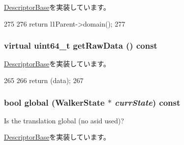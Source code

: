 \hyperlink{classArmISA_1_1TableWalker_1_1DescriptorBase_af3d561535442b70040e5fd7ff04eff12}{DescriptorBase}を実装しています。


\begin{DoxyCode}
275         {
276             return l1Parent->domain();
277         }
\end{DoxyCode}
\hypertarget{classArmISA_1_1TableWalker_1_1L2Descriptor_a22438a8aab2360360239d433b2f8fc50}{
\subsubsection[{getRawData}]{\setlength{\rightskip}{0pt plus 5cm}virtual uint64\_\-t getRawData () const}}
\label{classArmISA_1_1TableWalker_1_1L2Descriptor_a22438a8aab2360360239d433b2f8fc50}


\hyperlink{classArmISA_1_1TableWalker_1_1DescriptorBase_a2d8a1d7c99e0e52420d8be6cbd821697}{DescriptorBase}を実装しています。


\begin{DoxyCode}
265         {
266             return (data);
267         }
\end{DoxyCode}
\hypertarget{classArmISA_1_1TableWalker_1_1L2Descriptor_ad6798ebc36be05efa22b3fb9f3702d83}{
\subsubsection[{global}]{\setlength{\rightskip}{0pt plus 5cm}bool global ({\bf WalkerState} $\ast$ {\em currState}) const}}
\label{classArmISA_1_1TableWalker_1_1L2Descriptor_ad6798ebc36be05efa22b3fb9f3702d83}
Is the translation global (no asid used)? 

\hyperlink{classArmISA_1_1TableWalker_1_1DescriptorBase_a87704122ae25a982d2e3d92c5b0e9c25}{DescriptorBase}を実装しています。


